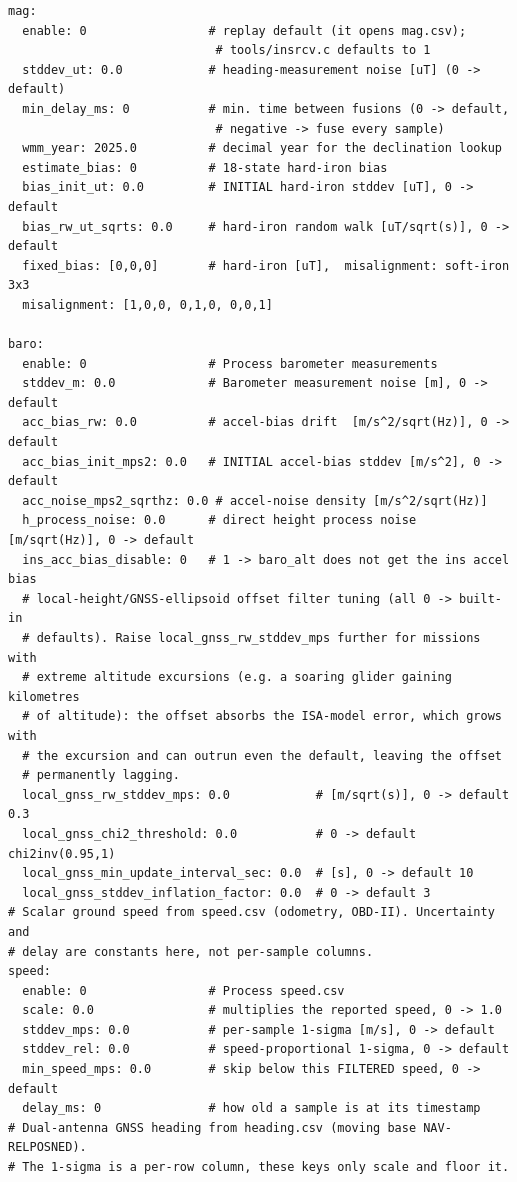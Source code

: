 \documentclass[11pt,a4paper]{article}
\begin{document}
\begin{lstlisting}[style=cfg]
mag:
  enable: 0                 # replay default (it opens mag.csv);
                             # tools/insrcv.c defaults to 1
  stddev_ut: 0.0            # heading-measurement noise [uT] (0 -> default)
  min_delay_ms: 0           # min. time between fusions (0 -> default,
                             # negative -> fuse every sample)
  wmm_year: 2025.0          # decimal year for the declination lookup
  estimate_bias: 0          # 18-state hard-iron bias
  bias_init_ut: 0.0         # INITIAL hard-iron stddev [uT], 0 -> default
  bias_rw_ut_sqrts: 0.0     # hard-iron random walk [uT/sqrt(s)], 0 -> default
  fixed_bias: [0,0,0]       # hard-iron [uT],  misalignment: soft-iron 3x3
  misalignment: [1,0,0, 0,1,0, 0,0,1]

baro:
  enable: 0                 # Process barometer measurements
  stddev_m: 0.0             # Barometer measurement noise [m], 0 -> default
  acc_bias_rw: 0.0          # accel-bias drift  [m/s^2/sqrt(Hz)], 0 -> default
  acc_bias_init_mps2: 0.0   # INITIAL accel-bias stddev [m/s^2], 0 -> default
  acc_noise_mps2_sqrthz: 0.0 # accel-noise density [m/s^2/sqrt(Hz)]
  h_process_noise: 0.0      # direct height process noise [m/sqrt(Hz)], 0 -> default
  ins_acc_bias_disable: 0   # 1 -> baro_alt does not get the ins accel bias
  # local-height/GNSS-ellipsoid offset filter tuning (all 0 -> built-in
  # defaults). Raise local_gnss_rw_stddev_mps further for missions with
  # extreme altitude excursions (e.g. a soaring glider gaining kilometres
  # of altitude): the offset absorbs the ISA-model error, which grows with
  # the excursion and can outrun even the default, leaving the offset
  # permanently lagging.
  local_gnss_rw_stddev_mps: 0.0            # [m/sqrt(s)], 0 -> default 0.3
  local_gnss_chi2_threshold: 0.0           # 0 -> default chi2inv(0.95,1)
  local_gnss_min_update_interval_sec: 0.0  # [s], 0 -> default 10
  local_gnss_stddev_inflation_factor: 0.0  # 0 -> default 3
# Scalar ground speed from speed.csv (odometry, OBD-II). Uncertainty and
# delay are constants here, not per-sample columns.
speed:
  enable: 0                 # Process speed.csv
  scale: 0.0                # multiplies the reported speed, 0 -> 1.0
  stddev_mps: 0.0           # per-sample 1-sigma [m/s], 0 -> default
  stddev_rel: 0.0           # speed-proportional 1-sigma, 0 -> default
  min_speed_mps: 0.0        # skip below this FILTERED speed, 0 -> default
  delay_ms: 0               # how old a sample is at its timestamp
# Dual-antenna GNSS heading from heading.csv (moving base NAV-RELPOSNED).
# The 1-sigma is a per-row column, these keys only scale and floor it.

\end{lstlisting}
\end{document}
